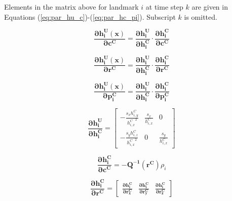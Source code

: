 \noindent Elements in the matrix above for landmark $i$ at time step
$k$ are given in Equations (\ref{eq:par_hu_c})-(\ref{eq:par_hc_pi}).
Subscript $k$ is omitted.

\begin{equation}
\label{eq:par_hu_c}
\boldsymbol{\frac{\partial h_{i}^{U}(x)}{\partial c^{C}}}=
\boldsymbol{\frac{\partial h_{i}^{U}}{\partial h_{i}^{C}}}\cdot 
\boldsymbol{\frac{\partial h_{i}^{C}}{\partial c^{C}}}
\end{equation}

\begin{equation}
\label{eq:par_hu_r}
\boldsymbol{\frac{\partial h_{i}^{U}(x)}{\partial r^{C}}}=
\boldsymbol{\frac{\partial h_{i}^{U}}{\partial h_{i}^{C}}}\cdot 
\boldsymbol{\frac{\partial h_{i}^{C}}{\partial r^{C}}}
\end{equation}

\begin{equation}
\label{eq:par_hu_p}
\boldsymbol{\frac{\partial h_{i}^{U}(x)}{\partial p_{i}^{C}}}=
\boldsymbol{\frac{\partial h_{i}^{U}}{\partial h_{i}^{C}}}\cdot 
\boldsymbol{\frac{\partial h_{i}^{C}}{\partial p_{i}^{C}}}
\end{equation}

\begin{equation}
\boldsymbol{\frac{\partial h_{i}^{U}}{\partial h_{i}^{C}}}= \begin{bmatrix}
-\frac{s_{x}h_{i,y}^{C}}{{h_{i,x}^{C}}^{2}} & \frac{s_{x}}{h_{i,x}^{C}} & 0 \\
-\frac{s_{y}h_{i,z}^{C}}{{h_{i,x}^{C}}^{2}} & 0 & \frac{s_{y}}{h_{i,x}^{C}}
\end{bmatrix}
\end{equation}

\begin{equation}
\boldsymbol{\frac{\partial h_i^{C}}{\partial c^{C}}}=-\boldsymbol{Q^{-1}(r^{C})}\rho _{i}
\end{equation}

\begin{equation}
\boldsymbol{\frac{\partial h_i^C}{\partial r^{C}}}=\begin{bmatrix} 
\boldsymbol{\frac{\partial h_i^{C}}{\partial r_{x}^{C}}} & 
\boldsymbol{\frac{\partial h_i^{C}}{\partial r_{y}^{C}}} & 
\boldsymbol{\frac{\partial h_i^{C}}{\partial r_{z}^{C}}}\end{bmatrix}
\end{equation}



